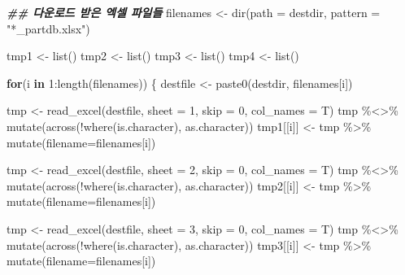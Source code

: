 \documentclass[
]{article}
\newenvironment{Shaded}{\begin{snugshade}}{\end{snugshade}}
\newcommand{\AttributeTok}[1]{\textcolor[rgb]{0.77,0.63,0.00}{#1}}
\newcommand{\ControlFlowTok}[1]{\textcolor[rgb]{0.13,0.29,0.53}{\textbf{#1}}}
\newcommand{\DecValTok}[1]{\textcolor[rgb]{0.00,0.00,0.81}{#1}}
\newcommand{\DocumentationTok}[1]{\textcolor[rgb]{0.56,0.35,0.01}{\textbf{\textit{#1}}}}
\newcommand{\FunctionTok}[1]{\textcolor[rgb]{0.00,0.00,0.00}{#1}}
\newcommand{\NormalTok}[1]{#1}
\newcommand{\OtherTok}[1]{\textcolor[rgb]{0.56,0.35,0.01}{#1}}
\newcommand{\SpecialCharTok}[1]{\textcolor[rgb]{0.00,0.00,0.00}{#1}}
\newcommand{\StringTok}[1]{\textcolor[rgb]{0.31,0.60,0.02}{#1}}
\begin{document}
\begin{Shaded}
\begin{Highlighting}[]
\DocumentationTok{\#\# 다운로드 받은 엑셀 파일들 }
\NormalTok{filenames }\OtherTok{\textless{}{-}} \FunctionTok{dir}\NormalTok{(}\AttributeTok{path =}\NormalTok{ destdir, }\AttributeTok{pattern =} \StringTok{"*\_partdb.xlsx"}\NormalTok{)}


\NormalTok{tmp1 }\OtherTok{\textless{}{-}} \FunctionTok{list}\NormalTok{()}
\NormalTok{tmp2 }\OtherTok{\textless{}{-}} \FunctionTok{list}\NormalTok{()}
\NormalTok{tmp3 }\OtherTok{\textless{}{-}} \FunctionTok{list}\NormalTok{()}
\NormalTok{tmp4 }\OtherTok{\textless{}{-}} \FunctionTok{list}\NormalTok{()}

\ControlFlowTok{for}\NormalTok{(i }\ControlFlowTok{in} \DecValTok{1}\SpecialCharTok{:}\FunctionTok{length}\NormalTok{(filenames)) \{}
\NormalTok{  destfile }\OtherTok{\textless{}{-}} \FunctionTok{paste0}\NormalTok{(destdir, filenames[i])}
  
\NormalTok{  tmp }\OtherTok{\textless{}{-}} \FunctionTok{read\_excel}\NormalTok{(destfile, }\AttributeTok{sheet =} \DecValTok{1}\NormalTok{, }\AttributeTok{skip =} \DecValTok{0}\NormalTok{, }\AttributeTok{col\_names =}\NormalTok{ T)}
\NormalTok{  tmp }\SpecialCharTok{\%\textless{}\textgreater{}\%} \FunctionTok{mutate}\NormalTok{(}\FunctionTok{across}\NormalTok{(}\SpecialCharTok{!}\FunctionTok{where}\NormalTok{(is.character), as.character)) }
\NormalTok{  tmp1[[i]] }\OtherTok{\textless{}{-}}\NormalTok{ tmp }\SpecialCharTok{\%\textgreater{}\%} \FunctionTok{mutate}\NormalTok{(}\AttributeTok{filename=}\NormalTok{filenames[i])}
  
\NormalTok{  tmp }\OtherTok{\textless{}{-}} \FunctionTok{read\_excel}\NormalTok{(destfile, }\AttributeTok{sheet =} \DecValTok{2}\NormalTok{, }\AttributeTok{skip =} \DecValTok{0}\NormalTok{, }\AttributeTok{col\_names =}\NormalTok{ T)}
\NormalTok{  tmp }\SpecialCharTok{\%\textless{}\textgreater{}\%} \FunctionTok{mutate}\NormalTok{(}\FunctionTok{across}\NormalTok{(}\SpecialCharTok{!}\FunctionTok{where}\NormalTok{(is.character), as.character)) }
\NormalTok{  tmp2[[i]] }\OtherTok{\textless{}{-}}\NormalTok{ tmp }\SpecialCharTok{\%\textgreater{}\%} \FunctionTok{mutate}\NormalTok{(}\AttributeTok{filename=}\NormalTok{filenames[i])}
  
\NormalTok{  tmp }\OtherTok{\textless{}{-}} \FunctionTok{read\_excel}\NormalTok{(destfile, }\AttributeTok{sheet =} \DecValTok{3}\NormalTok{, }\AttributeTok{skip =} \DecValTok{0}\NormalTok{, }\AttributeTok{col\_names =}\NormalTok{ T)}
\NormalTok{  tmp }\SpecialCharTok{\%\textless{}\textgreater{}\%} \FunctionTok{mutate}\NormalTok{(}\FunctionTok{across}\NormalTok{(}\SpecialCharTok{!}\FunctionTok{where}\NormalTok{(is.character), as.character)) }
\NormalTok{  tmp3[[i]] }\OtherTok{\textless{}{-}}\NormalTok{ tmp }\SpecialCharTok{\%\textgreater{}\%} \FunctionTok{mutate}\NormalTok{(}\AttributeTok{filename=}\NormalTok{filenames[i])}
  

\end{Highlighting}
\end{Shaded}
\end{document}
